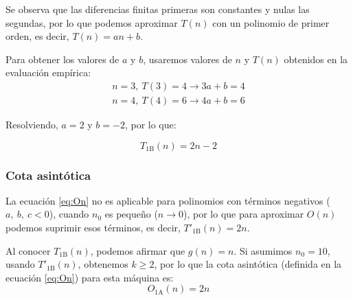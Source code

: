 Se observa que las diferencias finitas primeras son constantes y nulas las segundas, por lo que podemos aproximar $T(n)$ con un polinomio de primer orden, es decir, $T(n) = an + b$.\medskip

Para obtener los valores de $a$ y $b$, usaremos valores de $n$ y $T(n)$ obtenidos en la evaluación empírica:
\begin{subequations}
    \begin{gather*}
        n = 3,\ T(3) = 4 \rightarrow 3a + b = 4 \\
        n = 4,\ T(4) = 6 \rightarrow 4a + b = 6
    \end{gather*}
\end{subequations}

Resolviendo, $a = 2$ y $b = -2$, por lo que:

\begin{equation}
    T_{\mathrm{1B}}(n) = 2n - 2
\end{equation}

\subsubsection*{Cota asintótica}
La ecuación \ref{eq:On} no es aplicable para polinomios con términos negativos ($a,\ b,\ c < 0$), cuando $n_0$ es pequeño ($n \rightarrow 0$), por lo que para aproximar $O(n)$ podemos suprimir esos términos, es decir, $T'_{\mathrm{1B}}(n) = 2n$.

Al conocer $T_{\mathrm{1B}}(n)$, podemos afirmar que $g(n) = n$. Si asumimos $n_0 = 10$, usando $T'_{\mathrm{1B}}(n)$, obtenemos $k \geq 2$, por lo que la cota asintótica (definida en la ecuación \ref{eq:On}) para esta máquina es:
\begin{equation}
    O_{\mathrm{1A}}(n) = 2n
\end{equation}

